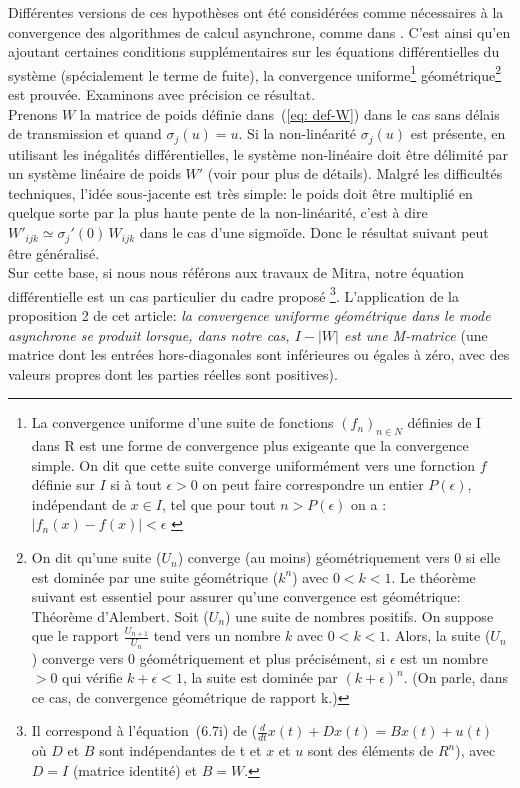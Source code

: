 Différentes versions de ces hypothèses ont été considérées comme nécessaires à la convergence des algorithmes de calcul asynchrone, comme dans \cite{Chazan:1969}. C'est ainsi qu'en ajoutant certaines conditions supplémentaires sur les équations différentielles du système (spécialement le terme de fuite), la convergence uniforme\footnote{La convergence uniforme d'une suite de fonctions $(f_n)_{n \in N}$ définies de I dans R est une forme de convergence plus exigeante que la convergence simple. On dit que cette suite converge uniformément vers une fornction $f$ définie sur $I$ si à tout $\epsilon>0$ on peut faire correspondre un entier $P(\epsilon)$, indépendant de $x\in I$, tel que pour tout $n>P(\epsilon)$ on a : $\vert f_n(x)-f(x)\vert<\epsilon$ \cite{Pisot:1966}} géométrique\footnote{On dit qu'une suite ($U_n$) converge (au moins) géométriquement vers 0 si elle est dominée par une suite géométrique ($k^n$) avec $0 < k < 1$. Le théorème suivant est essentiel pour assurer qu'une convergence est géométrique: Théorème d'Alembert. Soit ($U_n$) une suite de nombres positifs. On suppose que le rapport $\frac{U_{n+1}}{U_n}$ tend vers un nombre $k$ avec $0 < k < 1$. Alors, la suite ($U_n$) converge vers 0 géométriquement et plus précisément, si $\epsilon$ est un nombre $> 0$ qui vérifie $k +\epsilon< 1$, la suite est dominée par $(k + \epsilon)^n$. (On parle, dans ce cas, de convergence géométrique de rapport k.)} est prouvée. Examinons avec précision ce résultat.\\

Prenons ${W}$ la matrice de poids définie dans~(\ref {eq: def-W}) dans le cas sans délais de transmission et quand $\sigma_j(u) = u $. Si la non-linéarité $ \sigma_j (u) $ est présente, en utilisant les inégalités différentielles, le système non-linéaire doit être délimité par un système linéaire de poids $W'$ (voir \cite {Mitra:1987} pour plus de détails). Malgré les difficultés techniques, l'idée sous-jacente est très simple: le poids doit être multiplié en quelque sorte par la plus haute pente de la non-linéarité, c'est à dire $  W'_{ijk} \simeq \sigma_j '(0) \, W_{ijk } $ dans le cas d'une sigmoïde. Donc le résultat suivant peut être généralisé.\\

Sur cette base, si nous nous référons aux travaux de Mitra, notre équation différentielle est un cas particulier du cadre proposé \footnote {Il correspond à l'équation~(6.7i) de \cite{Mitra:1987} ($\frac{d}{dt}x(t)+Dx(t)=Bx(t)+u(t)$ o\`u $D$ et $B$ sont indépendantes de t et $x$ et $u$ sont des éléments de $R^{n}$), avec $ {D} = {I} $ (matrice identité) et $ {B} = {W} $.}. L'application de la proposition 2 de cet article: {\em la convergence uniforme géométrique dans le mode asynchrone se produit lorsque, dans notre cas, $ {I} - |{ W}|$ est une M-matrice} (une matrice dont les entrées hors-diagonales sont inférieures ou égales à zéro, avec des valeurs propres dont les parties réelles sont positives).\\

